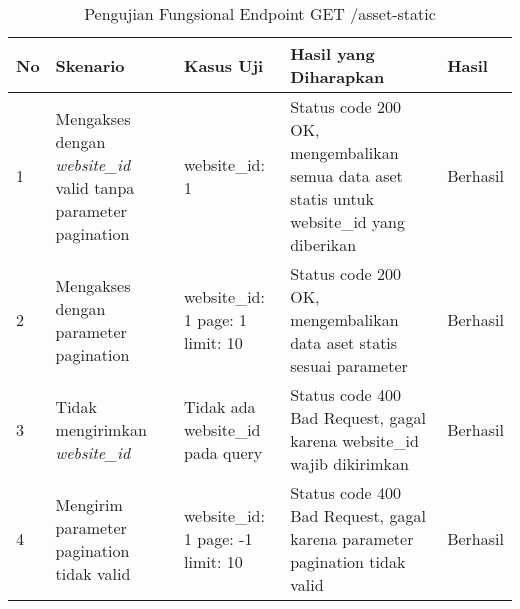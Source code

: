 \begin{table}[H]
    \centering
    \begin{tabular}{|p{0.5cm}|p{3cm}|p{5cm}|p{5cm}|p{1.5cm}|}
        \hline
        \rowcolor[HTML]{DAE8FC} 
        \textbf{No} & \textbf{Skenario} & \textbf{Kasus Uji} & \textbf{Hasil yang Diharapkan} & \textbf{Hasil} \\ \hline
        1 & Mengakses dengan \textit{website\_id} valid tanpa parameter pagination & 
        website\_id: 1 & 
        Status code 200 OK, mengembalikan semua data aset statis untuk website\_id yang diberikan & 
        Berhasil \\ \hline
        2 & Mengakses dengan parameter pagination & 
        website\_id: 1 \newline page: 1 \newline limit: 10 & 
        Status code 200 OK, mengembalikan data aset statis sesuai parameter & 
        Berhasil \\ \hline
        3 & Tidak mengirimkan \textit{website\_id} & 
        Tidak ada website\_id pada query & 
        Status code 400 Bad Request, gagal karena website\_id wajib dikirimkan & 
        Berhasil \\ \hline
        4 & Mengirim parameter pagination tidak valid & 
        website\_id: 1 \newline page: -1 \newline limit: 10 & 
        Status code 400 Bad Request, gagal karena parameter pagination tidak valid & 
        Berhasil \\ \hline
    \end{tabular}
    \caption{Pengujian Fungsional Endpoint GET /asset-static}
    \label{tab:asset_static_getall_testing}
\end{table}
